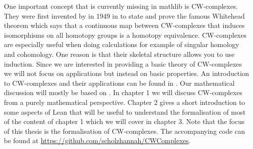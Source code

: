 One important concept that is currently missing in mathlib is CW-complexes. 
They were first invented by  in 1949 in \cite{Whitehead2018} to state and prove the famous Whitehead theorem which says that a continuous map between CW-complexes that induces isomorphisms on all homotopy groups is a homotopy equivalence.
CW-complexes are especially useful when doing calculations for example of singular homology and cohomology. 
One reason is that their skeletal structure allows you to use induction.
Since we are interested in providing a basic theory of CW-complexes we will not focus on applications but instead on basic properties. 
An introduction to CW-complexes and their applications can be found in \cite{Lundell1969}.
Our mathematical discussion will mostly be based on \cite{Hatcher2001}.
In chapter 1 we will discuss CW-complexes from a purely mathematical perspective. 
Chapter 2 gives a short introduction to some aspects of Lean that will be useful to understand the formalisation of most of the content of chapter 1 which we will cover in chapter 3. 
Note that the focus of this thesis is the formalisation of CW-complexes. 
The accompanying code can be found at \url{https://github.com/scholzhannah/CWComplexes}.